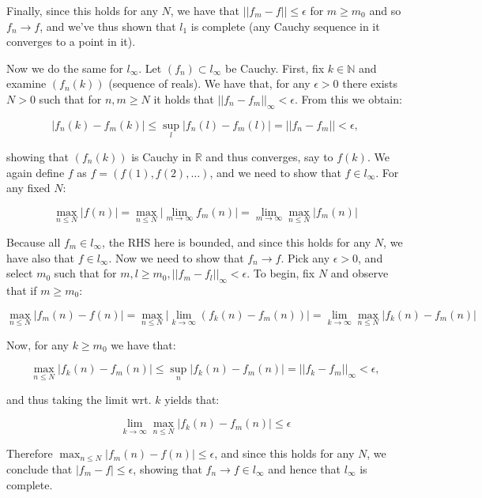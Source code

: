 \begin{solution}
    Finally, since this holds for any $N$, we have that $\lvert \lvert f_m -f \rvert \rvert \leq \epsilon$ for $m \geq m_0$ and so $f_n \rightarrow f$, and we've thus shown that $l_1$ is complete (any Cauchy sequence in it converges to a point in it).

    Now we do the same for $l_{\infty}$.
    Let $(f_n) \subset l_{\infty}$ be Cauchy.
    First, fix $k \in \mathbb{N}$ and examine $(f_n(k))$ (sequence of reals). 
    We have that, for any $\epsilon > 0$ there exists $N > 0$ such that for $n, m \geq N$ it holds that $\lvert \lvert f_n - f_m \rvert \rvert_{\infty} < \epsilon$.
    From this we obtain:

    \[\lvert f_n(k) - f_m(k) \rvert \leq \sup_{l} \lvert f_n(l) - f_m(l) \rvert = \lvert \lvert f_n - f_m \rvert \rvert < \epsilon,\]

    showing that $(f_n(k))$ is Cauchy in $\mathbb{R}$ and thus converges, say to $f(k)$.
    We again define $f$ as $f = (f(1), f(2), \ldots)$, and we need to show that $f \in l_{\infty}$.
    For any fixed $N$:

    \[\max_{n \leq N} \lvert f(n) \rvert = \max_{n \leq N} \lvert \lim_{m \rightarrow \infty} f_m(n) \rvert = \lim_{m \rightarrow \infty} \max_{n \leq N} \lvert f_m(n) \rvert\]

    Because all $f_m \in l_{\infty}$, the RHS here is bounded, and since this holds for any $N$, we have also that $f \in l_{\infty}$.
    Now we need to show that $f_n \rightarrow f$.
    Pick any $\epsilon > 0$, and select $m_0$ such that for $m, l \geq m_0, \lvert \lvert f_m - f_l \rvert \rvert _{\infty} < \epsilon$.
    To begin, fix $N$ and observe that if $m \geq m_0$:

    \[\max_{n \leq N} \lvert f_m(n) - f(n) \rvert = \max_{n \leq N} \lvert \lim_{k \rightarrow \infty} (f_k(n) - f_m(n) ) \rvert = \lim_{k \rightarrow \infty} \max_{n \leq N} \lvert f_k(n) -f_m(n) \rvert \]

    Now, for any $k \geq m_0$ we have that:

    \[\max_{n \leq N} \lvert f_k(n) - f_m(n) \rvert \leq \sup_{n} \lvert f_k(n) -f_m(n) \rvert = \lvert \lvert f_k -f_m \rvert \rvert _{\infty} < \epsilon,\]

    and thus taking the limit wrt. $k$ yields that:

    \[\lim_{k \rightarrow \infty} \max_{n \leq N} \lvert f_k(n) - f_m(n) \rvert \leq \epsilon\]

    Therefore $\max_{n \leq N} \lvert f_m(n) - f(n) \rvert \leq \epsilon$, and since this holds for any $N$, we conclude that $\lvert f_m - f \rvert \leq \epsilon$, showing that $f_n \rightarrow f \in l_{\infty}$ and hence that $l_{\infty}$ is complete.
    

\end{solution}

